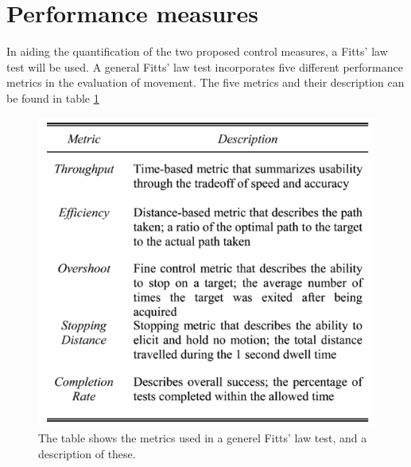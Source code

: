 

\section{Performance measures}
In aiding the quantification of the two proposed control measures, a Fitts' law test will be used. A general Fitts' law test incorporates five different performance metrics in the evaluation of movement.\cite{Kamavuako2014,Scheme2013} The five metrics and their description can be found in table \ref{fig:Fitts}    

  \begin{figure}[H]                                         
  	\includegraphics[width=.4\textwidth]{figures/Fitt}  
  	\caption{The table shows the metrics used in a generel Fitts' law test, and a description of these.\cite{Scheme2013}}
  	\label{fig:Fitts} 
  \end{figure} 